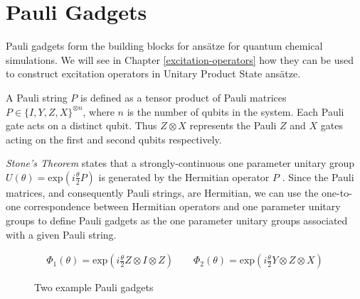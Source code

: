 \chapter{\label{pauli-gadgets}Pauli Gadgets}

Pauli gadgets form the building blocks for ansätze for quantum chemical simulations. We will see in Chapter \ref{excitation-operators} how they can be used to construct excitation operators in Unitary Product State ansätze.

A Pauli string $P$ is defined as a tensor product of Pauli matrices $P \in \{I, Y, Z, X\}^{\otimes n}$, where $n$ is the number of qubits in the system. Each Pauli gate acts on a distinct qubit. Thus $Z \otimes X$ represents the Pauli $Z$ and $X$ gates acting on the first and second qubits respectively.

\textit{Stone's Theorem} states that a strongly-continuous one parameter unitary group $U(\theta) = \text{exp}( i \frac{\theta}{2} P )$ is generated by the Hermitian operator $P$ \cite{Stone1932}. Since the Pauli matrices, and consequently Pauli strings, are Hermitian, we can use the one-to-one correspondence between Hermitian operators and one parameter unitary groups to define Pauli gadgets as the one parameter unitary groups associated with a given Pauli string.

\begin{figure}[H]
    \centering
    \begin{gather*}
        \Phi_1(\theta) = \text{exp}\left(i \frac{\theta}{2} Z \otimes I \otimes Z \right) \qquad
        \Phi_2(\theta) = \text{exp}\left(i \frac{\theta}{2} Y \otimes Z \otimes X \right)%
    \end{gather*}
    \caption{Two example Pauli gadgets}
\end{figure}
